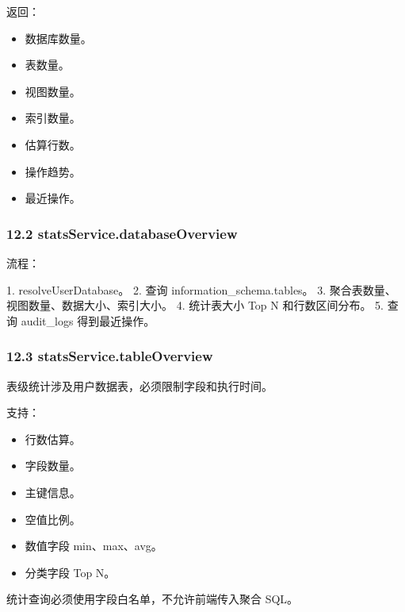 \documentclass[
  a4paper,
  UTF8]{ctexart}
\newenvironment{Shaded}{}{}
\newcommand{\NormalTok}[1]{#1}
\providecommand{\tightlist}{%
  \setlength{\itemsep}{0pt}\setlength{\parskip}{0pt}}
\begin{document}
返回：

\begin{itemize}
\tightlist
\item
  数据库数量。
\item
  表数量。
\item
  视图数量。
\item
  索引数量。
\item
  估算行数。
\item
  操作趋势。
\item
  最近操作。
\end{itemize}

\hypertarget{statsservice.databaseoverview}{%
\subsubsection{12.2
statsService.databaseOverview}\label{statsservice.databaseoverview}}

流程：

\begin{Shaded}
\begin{Highlighting}[]
\NormalTok{1. resolveUserDatabase。}
\NormalTok{2. 查询 information\_schema.tables。}
\NormalTok{3. 聚合表数量、视图数量、数据大小、索引大小。}
\NormalTok{4. 统计表大小 Top N 和行数区间分布。}
\NormalTok{5. 查询 audit\_logs 得到最近操作。}
\end{Highlighting}
\end{Shaded}

\hypertarget{statsservice.tableoverview}{%
\subsubsection{12.3
statsService.tableOverview}\label{statsservice.tableoverview}}

表级统计涉及用户数据表，必须限制字段和执行时间。

支持：

\begin{itemize}
\tightlist
\item
  行数估算。
\item
  字段数量。
\item
  主键信息。
\item
  空值比例。
\item
  数值字段 min、max、avg。
\item
  分类字段 Top N。
\end{itemize}

统计查询必须使用字段白名单，不允许前端传入聚合 SQL。
\end{document}
